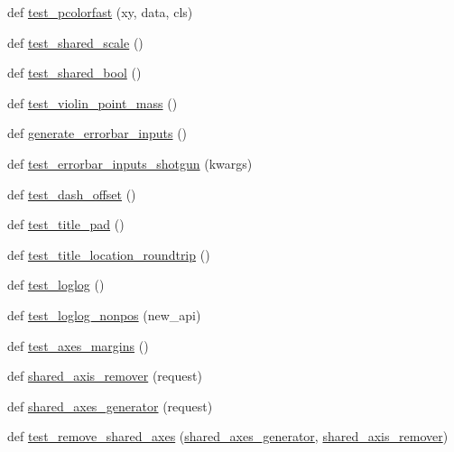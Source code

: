 \begin{DoxyCompactItemize}
def \hyperlink{namespacematplotlib_1_1tests_1_1test__axes_a25a41aa3bece4048225bbff4d14ea6b6}{test\+\_\+pcolorfast} (xy, data, cls)
\item 
def \hyperlink{namespacematplotlib_1_1tests_1_1test__axes_a3ddf3f70af4003e9ea8d331d67337188}{test\+\_\+shared\+\_\+scale} ()
\item 
def \hyperlink{namespacematplotlib_1_1tests_1_1test__axes_a76fd06e81aa799b119687c1fa51f57ad}{test\+\_\+shared\+\_\+bool} ()
\item 
def \hyperlink{namespacematplotlib_1_1tests_1_1test__axes_a5f4318fa836cc9fbe06e2c1ac8d7c865}{test\+\_\+violin\+\_\+point\+\_\+mass} ()
\item 
def \hyperlink{namespacematplotlib_1_1tests_1_1test__axes_a4927ce60fb78019e8cb3df62aca7eabf}{generate\+\_\+errorbar\+\_\+inputs} ()
\item 
def \hyperlink{namespacematplotlib_1_1tests_1_1test__axes_a9935689de84164e5ddcc3f4cd4cdfeeb}{test\+\_\+errorbar\+\_\+inputs\+\_\+shotgun} (kwargs)
\item 
def \hyperlink{namespacematplotlib_1_1tests_1_1test__axes_afd4cf70353ed9612bb278d22f43c758a}{test\+\_\+dash\+\_\+offset} ()
\item 
def \hyperlink{namespacematplotlib_1_1tests_1_1test__axes_a8ad54ffbd9f0f420d6a3b75d64e88978}{test\+\_\+title\+\_\+pad} ()
\item 
def \hyperlink{namespacematplotlib_1_1tests_1_1test__axes_a41df43795bbeaab22a986853cd1602ca}{test\+\_\+title\+\_\+location\+\_\+roundtrip} ()
\item 
def \hyperlink{namespacematplotlib_1_1tests_1_1test__axes_ab525085a3aff9c92915026258505e33f}{test\+\_\+loglog} ()
\item 
def \hyperlink{namespacematplotlib_1_1tests_1_1test__axes_ac6505aea332a470bf1a8902ca71ec274}{test\+\_\+loglog\+\_\+nonpos} (new\+\_\+api)
\item 
def \hyperlink{namespacematplotlib_1_1tests_1_1test__axes_a73d4bd1af0d6c03a9684cef16e2c054d}{test\+\_\+axes\+\_\+margins} ()
\item 
def \hyperlink{namespacematplotlib_1_1tests_1_1test__axes_ad08b9fe34f0a51dbc682e4ca42c30e96}{shared\+\_\+axis\+\_\+remover} (request)
\item 
def \hyperlink{namespacematplotlib_1_1tests_1_1test__axes_ab5b30228711a564d16a087288b8a7215}{shared\+\_\+axes\+\_\+generator} (request)
\item 
def \hyperlink{namespacematplotlib_1_1tests_1_1test__axes_a5b935856529f2bae3b4351bb7d768ac9}{test\+\_\+remove\+\_\+shared\+\_\+axes} (\hyperlink{namespacematplotlib_1_1tests_1_1test__axes_ab5b30228711a564d16a087288b8a7215}{shared\+\_\+axes\+\_\+generator}, \hyperlink{namespacematplotlib_1_1tests_1_1test__axes_ad08b9fe34f0a51dbc682e4ca42c30e96}{shared\+\_\+axis\+\_\+remover})

\end{DoxyCompactItemize}
